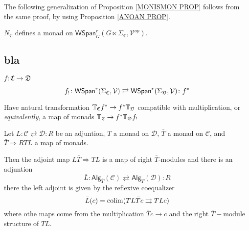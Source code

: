 \documentclass[a4paper,10pt
,draft
]{article}%
\renewcommand{\1}{\eta}%
\begin{document}
The following generalization of 
Proposition \ref{MONISMON PROP}
follows from the same proof,
by using Proposition \ref{ANOAN PROP}.

\begin{proposition}
$N_{\mathfrak{C}}$ defines a monad on 
$\mathsf{WSpan}_{G}^r(G \ltimes \Sigma_{\mathfrak{C}}, \mathcal{V}^{op})$.
\end{proposition}







\subsection{bla}

$f \colon \mathfrak{C} \to \mathfrak{D}$

\[f_! \colon 
\mathsf{WSpan}^{r}(\Sigma_{\mathfrak{C}},\mathcal{V})
\rightleftarrows
\mathsf{WSpan}^{r}(\Sigma_{\mathfrak{D}},\mathcal{V})
\colon f^{\**}\]

Have natural transformation
$
\mathbb{T}_{\mathfrak{C}} f^{\**} \to 
f^{\**} \mathbb{T}_{\mathfrak{D}}
$
compatible with multiplication,
or \textit{equivalently},
a map of monads 
$
\mathbb{T}_{\mathfrak{C}} \to 
f^{\**} \mathbb{T}_{\mathfrak{D}} f_!
$


\begin{proposition}
Let 
$L \colon \mathcal{C}
\rightleftarrows
\mathcal{D} \colon R$
be an adjuntion, 
$T$ a monad on $\mathcal{D}$,
$\bar{T}$ a monad on $\mathcal{C}$,
and 
$\bar{T} \Rightarrow RTL$
a map of monads.

Then the adjoint map
$L\bar{T} \Rightarrow TL$
is a map of right $\bar{T}$-modules and there is an adjuntion
\[\bar{L} \colon \mathsf{Alg}_{\bar{T}}(\mathcal{C})
\rightleftarrows
\mathsf{Alg}_{T}(\mathcal{D}) \colon R\]
there the left adjoint is given by the reflexive coequalizer
\begin{equation}\label{LEFADJ EQ}
\bar{L}(c) = 
\operatorname{colim} (TL\bar{T} c \rightrightarrows TL c)
\end{equation}
where othe maps come from the multiplication 
$\bar{T}c \to c$ and the right $\bar{T}-$module structure of $TL$.
\end{proposition}
\end{document}
